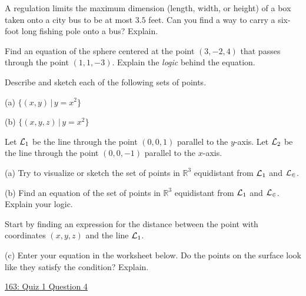 \documentclass{ximera}
\begin{document}
\begin{question}  \label{Q:943r34r2324}
A regulation limits the maximum dimension (length, width, or height) of a box taken onto a city bus to be at most $3.5$ feet. Can you find a way to carry a six-foot long fishing pole onto a bus? Explain.
\end{question}


\begin{question}  \label{Q:9df3323234}
Find an equation of the sphere centered at the point $(3,-2,4)$ that passes through the point $(1,1,-3)$. Explain the \emph{logic} behind the equation.
\end{question}

\begin{question}  \label{Q4441223313}
Describe and sketch each of the following sets of points.

(a) $\{ (x,y) \, | \, y=x^2 \}$

(b) $\{ (x,y,z) \, | \, y=x^2 \}$
\end{question}


\begin{question}  \label{Qpo23473032}
Let ${\cal L}_1$ be the line through the point $(0,0,1)$ parallel to the $y$-axis. Let ${\cal L}_2$ be the line through the point $(0,0,-1)$ parallel to the $x$-axis.

(a) Try to visualize or sketch the set of points in $\mathbb{R}^3$ equidistant from ${\cal L}_1$ and ${\cal L_2}$.

(b) Find an equation of the set of points in $\mathbb{R}^3$ equidistant from ${\cal L}_1$ and ${\cal L_2}$. Explain your logic.

\begin{hint}
Start by finding an expression for the distance between the point with coordinates $(x,y,z)$ and the line ${\cal L}_1$.
\end{hint}

(c) Enter  your equation in the worksheet below. Do the points on the surface look like they satisfy the condition? Explain.

\begin{onlineOnly}
    \begin{center}
\end{center}
\end{onlineOnly}

\href{https://www.desmos.com/3d/pzksnds2pe}{163: Quiz 1 Question 4}


\end{question}
\end{document}
